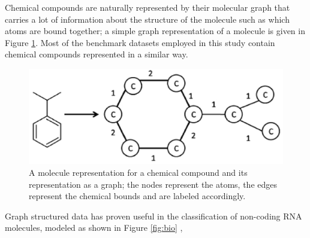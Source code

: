 Chemical compounds are naturally represented by their molecular graph that carries
a lot of information about the structure of the molecule such as which atoms are
bound together; a simple graph representation of a molecule is given in Figure \ref{fig:chem}.
Most of the benchmark datasets employed in this study contain chemical compounds
represented in a similar way.

\begin{figure}[ht]
    \centering
    \includegraphics[scale=0.4]{Figures/chcomp}
    \caption{A molecule representation for a chemical compound and its representation
    as a graph; the nodes represent the atoms, the edges represent the chemical bounds and
    are labeled accordingly.}
    \label{fig:chem}
\end{figure}

Graph structured data has proven useful in the classification of non-coding RNA
molecules, modeled as shown in Figure \ref{fig:bio} \cite{nnavarin, conf/psb/KarklinMH05},

